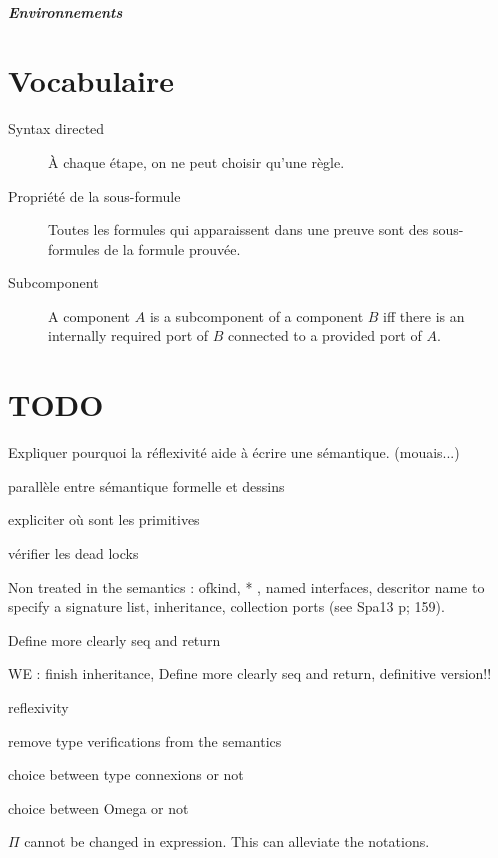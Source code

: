 \begin{appendices}
\paragraph{Environnements}

\chapter{Vocabulaire}
\begin{description}
\item[Syntax directed] À chaque étape, on ne peut choisir qu'une règle.
\item[Propriété de la sous-formule] Toutes les formules qui apparaissent dans une preuve sont des sous-formules de la formule prouvée.
\item[Subcomponent] A component $A$ is a subcomponent of a component $B$ iff there is an internally required port of $B$ connected to a provided port of $A$.
\end{description}


\chapter{TODO}
Expliquer pourquoi la réflexivité aide à écrire une sémantique. (mouais...)

parallèle entre sémantique formelle et dessins

expliciter où sont les primitives

vérifier les dead locks


Non treated in the semantics : ofkind, * , named interfaces, descritor name to specify a signature list, inheritance, collection ports (see Spa13 p; 159).

Define more clearly seq and return

WE : finish inheritance, Define more clearly seq and return, definitive version!!

reflexivity

remove type verifications from the semantics 

choice between type connexions or not

choice between Omega or not

$\Pi$ cannot be changed in expression. This can alleviate the notations.
\end{appendices}
\cite{SDT14}
\cite{Spa13}





